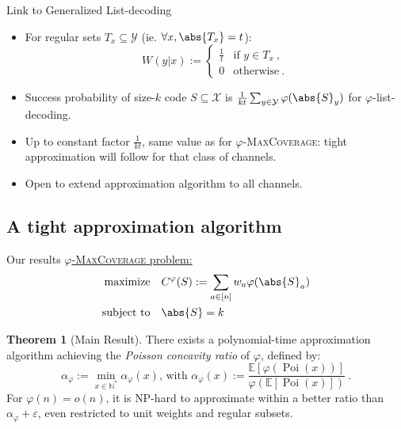 \documentclass{beamer}
\theoremstyle{definition}
\newtheorem{theo}{Theorem}[section]
\theoremstyle{remark}
\DeclareMathOperator{\Poi}{\text{Poi}}
\DeclareMathOperator{\maxi}{\text{maximize}}
\DeclareMathOperator{\st}{\text{subject to}}
\begin{document}
\begin{frame}{Link to Generalized List-decoding}
  \begin{itemize}
  \item For regular sets $T_x \subseteq \mathcal{Y}$ (ie. $\forall x, \abs{T_x}=t$):
    \[ W(y|x) := \begin{cases}
      \frac{1}{t} & \text{if } y \in T_x\ ,\\
      0 & \text{otherwise}\ .
    \end{cases}\]
  \item Success probability of size-$k$ code $S \subseteq \mathcal{X}$ is $\frac{1}{kt}\sum_{y \in \mathcal{Y}} \varphi(\abs{S}_y)$ for $\varphi$-list-decoding.
    \bigskip
    \pause
  \item Up to constant factor $\frac{1}{kt}$, same value as for $\varphi$-\textsc{MaxCoverage}: tight approximation will follow for that class of channels.
  \item Open to extend approximation algorithm to all channels.
  \end{itemize}
\end{frame}

\subsection{A tight approximation algorithm}
\begin{frame}{Our results}
  \underline{$\varphi$-\textsc{MaxCoverage} problem:}
    \begin{align*}
      \maxi &&& C^{\varphi}(S) := \sum_{a \in [n]} w_a\varphi(\abs{S}_a)\\
      \st &&& \abs{S} = k
    \end{align*}

  \pause
  
  \begin{theo}[Main Result]
    There exists a polynomial-time approximation algorithm achieving the \emph{Poisson concavity ratio} of $\varphi$, defined by:
    \[ \alpha_{\varphi} := \min_{x \in \mathbb{N}^*} \alpha_{\varphi}(x) \text{, with } \alpha_{\varphi}(x) := \frac{\mathbb{E}[\varphi(\Poi(x))]}{\varphi(\mathbb{E}[\Poi(x)])}\ .\]
    For $\varphi(n) = o(n)$, it is \textrm{NP}-hard to approximate within a better ratio than $\alpha_\varphi + \varepsilon$, even restricted to unit weights and regular subsets.
  \end{theo}
\end{frame}
\end{document}
